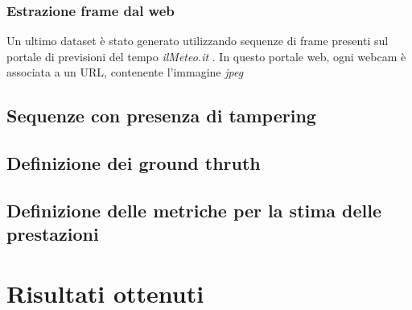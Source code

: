 \subsubsection{Estrazione frame dal web}
Un ultimo dataset \`e stato generato utilizzando sequenze di frame presenti sul portale di previsioni del tempo \textit{ilMeteo.it} \cite{ilmeteo}.
In questo portale web, ogni webcam \`e associata a un URL, contenente l'immagine \textit{jpeg}
\subsection{Sequenze con presenza di tampering}
\subsection{Definizione dei ground thruth}
\subsection{Definizione delle metriche per la stima delle prestazioni}
\section{Risultati ottenuti}
\label{risultati}